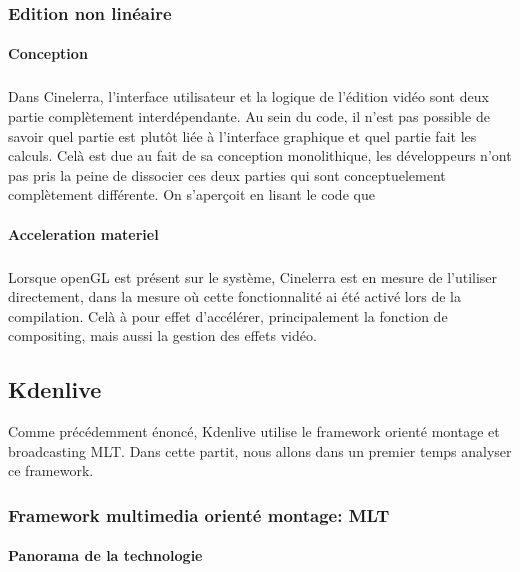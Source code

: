 \subsubsection{Edition non linéaire}

\paragraph{Conception}

\subparagraph{}

Dans Cinelerra, l'interface utilisateur et la logique de l'édition
vidéo sont deux partie complètement interdépendante. Au sein du
code, il n'est pas possible de savoir quel partie est plutôt liée à
l'interface graphique et quel partie fait les calculs. Celà est due au
fait de sa conception monolithique, les développeurs n'ont pas pris la
peine de dissocier ces deux parties qui sont conceptuelement complètement
différente. On s'aperçoit en lisant le code que

\paragraph{Acceleration materiel}

\subparagraph{}

Lorsque openGL est présent sur le système, Cinelerra
est en mesure de l'utiliser directement, dans la mesure où cette
fonctionnalité ai été activé lors de la compilation. Celà à pour
effet d'accélérer, principalement la fonction de compositing, mais
aussi la gestion des effets vidéo.

\subsection {Kdenlive}

Comme précédemment énoncé, Kdenlive utilise le framework orienté
montage et broadcasting MLT. Dans cette partit, nous allons dans un
premier temps analyser ce framework.

\subsubsection {Framework multimedia orienté montage: MLT}

\paragraph {Panorama de la technologie} %


